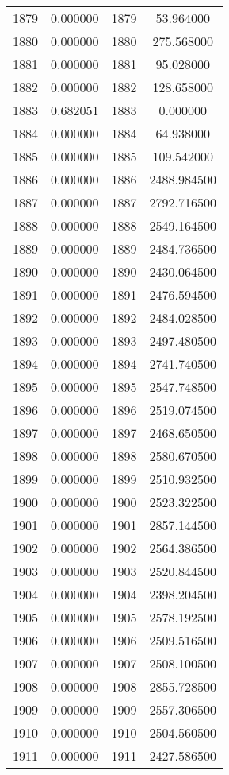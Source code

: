 \documentclass[12pt]{article}
\begin{document}
\begin{longtable}{@{}cccc@{}}
1879 & 0.000000 & 1879 & 53.964000 \\
1880 & 0.000000 & 1880 & 275.568000 \\
1881 & 0.000000 & 1881 & 95.028000 \\
1882 & 0.000000 & 1882 & 128.658000 \\
1883 & 0.682051 & 1883 & 0.000000 \\
1884 & 0.000000 & 1884 & 64.938000 \\
1885 & 0.000000 & 1885 & 109.542000 \\
1886 & 0.000000 & 1886 & 2488.984500 \\
1887 & 0.000000 & 1887 & 2792.716500 \\
1888 & 0.000000 & 1888 & 2549.164500 \\
1889 & 0.000000 & 1889 & 2484.736500 \\
1890 & 0.000000 & 1890 & 2430.064500 \\
1891 & 0.000000 & 1891 & 2476.594500 \\
1892 & 0.000000 & 1892 & 2484.028500 \\
1893 & 0.000000 & 1893 & 2497.480500 \\
1894 & 0.000000 & 1894 & 2741.740500 \\
1895 & 0.000000 & 1895 & 2547.748500 \\
1896 & 0.000000 & 1896 & 2519.074500 \\
1897 & 0.000000 & 1897 & 2468.650500 \\
1898 & 0.000000 & 1898 & 2580.670500 \\
1899 & 0.000000 & 1899 & 2510.932500 \\
1900 & 0.000000 & 1900 & 2523.322500 \\
1901 & 0.000000 & 1901 & 2857.144500 \\
1902 & 0.000000 & 1902 & 2564.386500 \\
1903 & 0.000000 & 1903 & 2520.844500 \\
1904 & 0.000000 & 1904 & 2398.204500 \\
1905 & 0.000000 & 1905 & 2578.192500 \\
1906 & 0.000000 & 1906 & 2509.516500 \\
1907 & 0.000000 & 1907 & 2508.100500 \\
1908 & 0.000000 & 1908 & 2855.728500 \\
1909 & 0.000000 & 1909 & 2557.306500 \\
1910 & 0.000000 & 1910 & 2504.560500 \\
1911 & 0.000000 & 1911 & 2427.586500 \\

\end{longtable}
\end{document}
